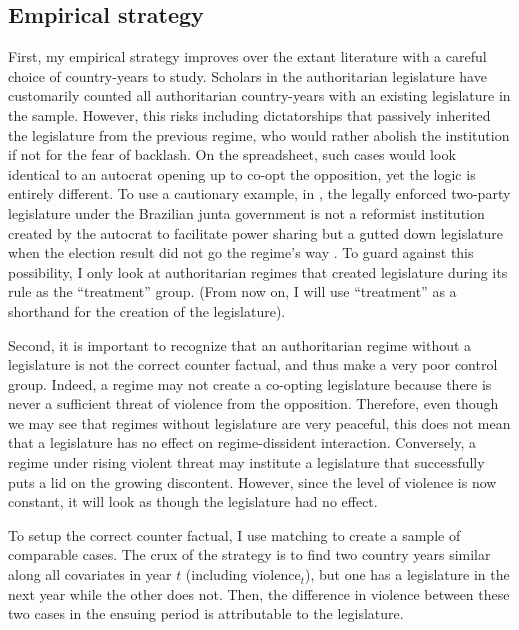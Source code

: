 \subsection{Empirical strategy}

First, my empirical strategy improves over the extant literature with a careful choice of country-years to study. Scholars in the authoritarian legislature have customarily counted all authoritarian country-years with an existing legislature in the sample. However, this risks including dictatorships that passively inherited the legislature from the previous regime, who would rather abolish the institution if not for the fear of backlash. On the spreadsheet, such cases would look identical to an autocrat opening up to co-opt the opposition, yet the logic is entirely different. To use a cautionary example, in \citet[1283]{Gandhi2007}, the legally enforced two-party legislature under the Brazilian junta government is not a reformist institution created by the autocrat to facilitate power sharing but a gutted down legislature when the election result did not go the regime's way \citep{Stepan1976}. To guard against this possibility, I only look at authoritarian regimes that created  legislature during its rule as the ``treatment'' group. (From now on, I will use ``treatment'' as a shorthand for the creation of the legislature).

Second, it is important to recognize that an authoritarian regime without a legislature is not the correct counter factual, and thus make a very poor control group. Indeed, a regime may not create a co-opting legislature because there is never a sufficient threat of violence from the opposition. Therefore, even though we may see that regimes without legislature are very peaceful, this does not mean that a legislature has no effect on regime-dissident interaction. Conversely, a regime under rising violent threat may institute a legislature that successfully puts a lid on the growing discontent. However, since the level of violence is now constant, it will look as though the legislature had no effect.

To setup the correct counter factual, I use matching to create a sample of comparable cases. The crux of the strategy is to find two country years similar along all covariates in year $t$ (including $\text{violence}_t$), but one has a legislature in the next year while the other does not. Then, the difference in violence between these two cases in the ensuing period is attributable to the legislature.

